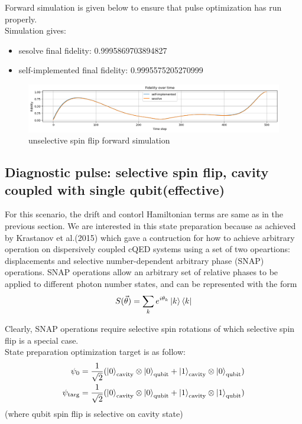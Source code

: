 \documentclass{article}
\begin{document}
Forward simulation is given below to ensure that pulse optimization has run properly. 
\\
Simulation gives: 
\begin{itemize}
    \item sesolve final fidelity:  0.9995869703894827
    \item self-implemented final fidelity:  0.9995575205270999
\end{itemize}
\begin{figure}[H]
    \centering
    \includegraphics[width=0.6\linewidth]{unselective_spin_flip_simulation.png}
    \caption{unselective spin flip forward simulation}
    \label{fig:unselective_spin_flip_forward_simulation}
\end{figure}

\subsection{Diagnostic pulse: selective spin flip, cavity coupled with single qubit(effective)}

For this scenario, the drift and contorl Hamiltonian terms are same as in the previous section. We are interested in this state 
preparation because as achieved by Krastanov et al.(2015) \cite{Krastanov2015} which gave a contruction for how to achieve arbitrary 
operation on dispersively coupled cQED systems using a set of two opeartions: displacements and selective number-dependent arbitrary phase (SNAP) operations. 
SNAP operations allow an arbitrary set of relative phases to be applied to different photon number states, and can be represented with the form
\begin{equation}
    S(\vec{\theta}) = \sum_k e^{i\theta_k} \ket{k}\bra{k}
\end{equation}

Clearly, SNAP operations require selective spin rotations of which selective spin flip is a special case.
\\
State preparation optimization target is as follow: 
\begin{align*}
    \psi_0 &= \frac{1}{\sqrt{2}} (\ket{0}_{\text{cavity}} \otimes \ket{0}_{\text{qubit}} 
                + \ket{1}_{\text{cavity}} \otimes \ket{0}_{\text{qubit}})\\
    \psi_{\text{targ}} &= \frac{1}{\sqrt{2}} (\ket{0}_{\text{cavity}} \otimes \ket{0}_{\text{qubit}} 
                + \ket{1}_{\text{cavity}} \otimes \ket{1}_{\text{qubit}})\\
\end{align*}
(where qubit spin flip is selective on cavity state)
\end{document}
